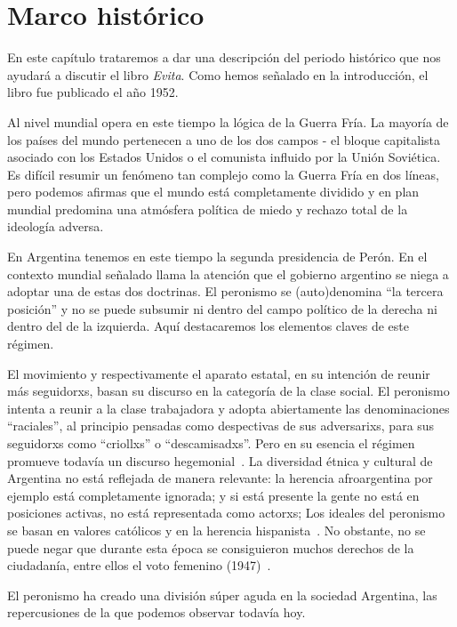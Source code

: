 \documentclass[
10pt, %
a4paper, %
oneside, %
headinclude,footinclude, %
]{scrartcl}
\begin{document}
\section{Marco histórico}
\label{sec:background}

En este capítulo trataremos a dar una descripción del periodo histórico que nos ayudará a discutir el libro \textit{Evita}.
Como hemos señalado en la introducción, el libro fue publicado el año 1952.

Al nivel mundial opera en este tiempo la lógica de la Guerra Fría.
La mayoría de los países del mundo pertenecen a uno de los dos campos - el bloque capitalista asociado con los Estados Unidos o el comunista influido por la Unión Soviética.
Es difícil resumir un fenómeno tan complejo como la Guerra Fría en dos líneas, pero podemos afirmas que el mundo está completamente dividido y en plan mundial predomina una atmósfera política de miedo y rechazo total de la ideología adversa.

En Argentina tenemos en este tiempo la segunda presidencia de Perón.
En el contexto mundial señalado llama la atención que el gobierno argentino se niega a adoptar una de estas dos doctrinas.
El peronismo se (auto)denomina ``la tercera posición'' y no se puede subsumir ni dentro del campo político de la derecha ni dentro del de la izquierda.
Aquí destacaremos los elementos claves de este régimen.

El movimiento y respectivamente el aparato estatal, en su intención de reunir más seguidorxs, basan su discurso en la categoría de la clase social.
El peronismo intenta a reunir a la clase trabajadora y adopta abiertamente las denominaciones ``raciales'', al principio pensadas como despectivas de sus adversarixs, para sus seguidorxs como ``criollxs'' o ``descamisadxs''.
Pero en su esencia el régimen promueve todavía un discurso hegemonial~\autocite{Chamosa2010}.
La diversidad étnica y cultural de Argentina no está reflejada de manera relevante:
la herencia afroargentina por ejemplo está completamente ignorada;
y si está presente la gente no está en posiciones activas, no está representada como actorxs;
Los ideales del peronismo se basan en valores católicos y en la herencia hispanista~\autocite[p.116]{Chamosa2010}.
No obstante, no se puede negar que durante esta época se consiguieron muchos derechos de la ciudadanía, entre ellos el voto femenino (1947)~\autocite[p.114]{Chamosa2010}.

El peronismo ha creado una división súper aguda en la sociedad Argentina, las repercusiones de la que podemos observar todavía hoy.
\end{document}
